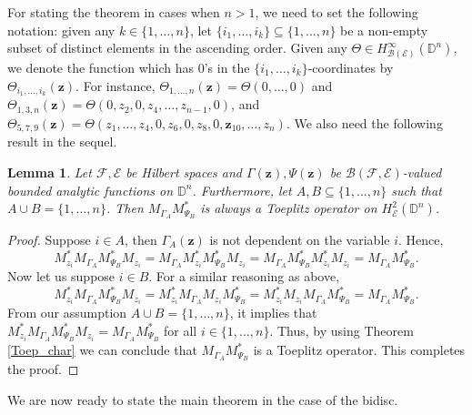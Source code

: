 \documentclass[12pt]{amsart}
\newtheorem{lemma}[propn]{Lemma}
\theoremstyle{definition}
\newcommand{\D}{\mathbb{D}}
\newcommand{\1}{{\mbox{\bf 1}}}
\newcommand{\clb}{\mathcal{B}}
\newcommand{\cle}{\mathcal{E}}
\newcommand{\clf}{\mathcal{F}}
\newcommand{\z}{\bm{z}}
\begin{document}
For stating the theorem in cases when $n>1$, we need to set the following notation: \textsf{given any $k \in \{1,\ldots,n\}$, let $\{i_1,\ldots,i_k\} \subseteq \{1,\ldots,n\}$ be a non-empty subset of distinct elements in the ascending order. Given any $\Theta \in H_{\clb(\cle)}^{\infty}(\D^n)$, we denote the function which has $0$'s in the $\{i_1,\ldots,i_k\}$-coordinates by $\Theta_{i_1, \ldots, i_k}(\bm{z})$. For instance, $\Theta_{1, \ldots, n}(\bm{z}) = \Theta(0, \ldots,0)$ and $\Theta_{1,3,n}(\bm{z}) = \Theta(0,z_2,0,z_4,\ldots,z_{n-1}, 0)$, and $\Theta_{5,7,9}(\bm{z}) = \Theta(z_1,\ldots,z_4,0,z_6,0,z_8,0,\z_{10},\ldots,z_{n})$}. We also need the following result in the sequel.
\begin{lemma}\label{rule}
Let $\clf, \cle$ be Hilbert spaces and $\Gamma(\bm{z}), \Psi(\bm{z})$ be $\clb(\clf,\cle)$-valued bounded analytic functions on $\D^n$.  Furthermore, let $A,B \subseteq \{1,\ldots,n\}$ such that $A \cup B = \{1,\ldots,n\}$. Then $M_{\Gamma_A} M_{\Psi_B}^*$ is always a Toeplitz operator on $H_{\cle}^2(\D^n)$.
\end{lemma}
\begin{proof}
Suppose $i \in A$, then $\Gamma_A(\bm{z})$ is not dependent on the variable $i$. Hence,
\[
M_{z_i}^* M_{\Gamma_A} M_{\Psi_B}^* M_{z_i} =  M_{\Gamma_A} M_{z_i}^* M_{\Psi_B}^* M_{z_i} = M_{\Gamma_A} M_{\Psi_B}^* M_{z_i}^*  M_{z_i} = M_{\Gamma_A} M_{\Psi_B}^*.
\]
Now let us suppose $i \in B$. For a similar reasoning as above,
\[
M_{z_i}^* M_{\Gamma_A} M_{\Psi_B}^* M_{z_i} =  M_{z_i}^* M_{\Gamma_A} M_{z_i} M_{\Psi_B}^* = M_{z_i}^* M_{z_i} M_{\Gamma_A} M_{\Psi_B}^* = M_{\Gamma_A} M_{\Psi_B}^*.
\]
From our assumption $A \cup B = \{1,\ldots,n\}$,  it implies that $M_{z_i}^* M_{\Gamma_A} M_{\Psi_B}^* M_{z_i}= M_{\Gamma_A} M_{\Psi_B}^*$ for all $i \in \{1,\ldots,n\}$. Thus, by using Theorem \ref{Toep_char}  we can conclude that $M_{\Gamma_A}M_{\Psi_B}^*$ is a Toeplitz operator. This completes the proof.
\end{proof}
We are now ready to state the main theorem in the case of the bidisc.
\end{document}
